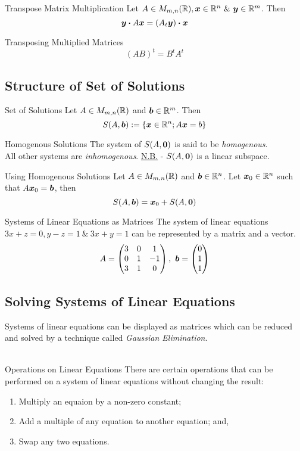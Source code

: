 \documentclass[11pt,a4paper]{article}
\begin{document}
\subtitle{Theorem 3.12 - }{Transpose Matrix Multiplication}
Let $A \in M_{m,n}(\real), \vect{x} \in \real^n\ \&\ \vect{y} \in \real^m$. Then
$$\boldsymbol{y} \boldsymbol{\cdot} A \boldsymbol{x} = \left(A_t \boldsymbol{y}\right) \boldsymbol{\cdot} \boldsymbol{x}$$

\subtitle{Theorem 3.10 - }{Transposing Multiplied Matrices}
$$(AB)^t = B^t A^t$$

\subsection{Structure of Set of Solutions}
%
\subtitle{Definition 3.13 - }{Set of Solutions}
Let $A \in M_{m,n}(\mathbb{R})$ and $\boldsymbol{b} \in \mathbb{R}^m$. Then
$$S(A, \boldsymbol{b}) :=\left\{\boldsymbol{x} \in \mathbb{R}^n; A\boldsymbol{x} = b\right\}$$

\subtitle{Definition 3.14 - }{Homogenous Solutions}
The system of $S(A, \boldsymbol{0})$ is said to be \textit{homogenous}.\\
All other systems are \textit{inhomogenous}.
\underline{N.B.} - $S(A, \boldsymbol{0})$ is a linear subspace. \\

\subtitle{Theorem 3.15 - }{Using Homogenous Solutions}
Let $A \in M_{m,n}(\mathbb{R})$ and $\boldsymbol{b} \in \mathbb{R}^n$. Let $\boldsymbol{x}_0 \in \mathbb{R}^n$ such that $A\boldsymbol{x}_0 = \boldsymbol{b}$, then
$$S(A, \boldsymbol{b}) = {\boldsymbol{x}_0} + S(A, \boldsymbol{0})$$

\subtitle{Remark 3.16 - }{Systems of Linear Equations as Matrices}
The system of linear equations $3x + z = 0, y - z = 1\ \&\ 3x + y = 1$ can be represented by a matrix and a vector.
$$A = \begin{pmatrix}
3 & 0 & 1 \\
0 & 1 & -1 \\
3 & 1 & 0
\end{pmatrix},\ \boldsymbol{b} = \begin{pmatrix}
0 \\ 1 \\ 1
\end{pmatrix}$$

\subsection{Solving Systems of Linear Equations}
Systems of linear equations can be displayed as matrices which can be reduced and solved by a technique called \textit{Gaussian Elimination}. \\ \\
%
\subtitle{Theorem 3.17 - }{Operations on Linear Equations}
There are certain operations that can be performed on a system of linear equations without changing the result:
\begin{enumerate}[label=\roman*)]
  \item Multiply an equaion by a non-zero constant;
  \item Add a multiple of any equation to another equation; and,
  \item Swap any two equations.\\
\end{enumerate}
\end{document}

